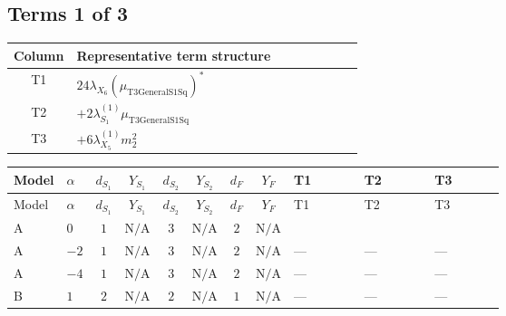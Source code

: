 \documentclass[8pt]{article}
\begin{document}
\begin{landscape}
\subsection*{Terms 1 of 3}
\begin{center}
\begin{tabular}{@{}c >{\raggedright\arraybackslash}p{0.82\linewidth}@{}}
\toprule
Column & Representative term structure \\
\midrule
T1 & \(\displaystyle 24 {\lambda_{X_{6}}} \left({\mu_{\mathrm{T3GeneralS1Sq}}}\right)^{*}\) \\
\midrule
T2 & \(\displaystyle +2 {\lambda_{S_1}^{(1)}} {\mu_{\mathrm{T3GeneralS1Sq}}}\) \\
\midrule
T3 & \(\displaystyle +6 {\lambda_{X_{5}}^{(1)}} {m_2^2}\) \\
\midrule
\bottomrule
\end{tabular}
\end{center}
\smallskip
\tiny
\begin{longtable}{@{}llcccccc >{\raggedright\arraybackslash}p{0.21\linewidth} >{\raggedright\arraybackslash}p{0.21\linewidth} >{\raggedright\arraybackslash}p{0.21\linewidth}@{}}
\toprule
Model & $\alpha$ & $d_{S_1}$ & $Y_{S_1}$ & $d_{S_2}$ & $Y_{S_2}$ & $d_F$ & $Y_F$ & T1 & T2 & T3 \\
\midrule
\endfirsthead
\toprule
Model & $\alpha$ & $d_{S_1}$ & $Y_{S_1}$ & $d_{S_2}$ & $Y_{S_2}$ & $d_F$ & $Y_F$ & T1 & T2 & T3 \\
\midrule
\endhead
A & $0$ & $1$ & $\text{N/A}$ & $3$ & $\text{N/A}$ & $2$ & $\text{N/A}$ & \scriptsize\adjustbox{max width=\linewidth}{$\begin{gathered} 24 {\lambda_{X_{6}}} \left({\mu_{\mathrm{T3GeneralS1Sq}}}\right)^{*}\end{gathered}$} & \scriptsize\adjustbox{max width=\linewidth}{$\begin{gathered} +2 {\lambda_{S_1}^{(1)}} {\mu_{\mathrm{T3GeneralS1Sq}}}\end{gathered}$} & \scriptsize\adjustbox{max width=\linewidth}{$\begin{gathered} +6 {\lambda_{X_{5}}^{(1)}} {m_2^2}\end{gathered}$} \\
\midrule
A & $-2$ & $1$ & $\text{N/A}$ & $3$ & $\text{N/A}$ & $2$ & $\text{N/A}$ & --- & --- & --- \\
\midrule
A & $-4$ & $1$ & $\text{N/A}$ & $3$ & $\text{N/A}$ & $2$ & $\text{N/A}$ & --- & --- & --- \\
\midrule
B & $1$ & $2$ & $\text{N/A}$ & $2$ & $\text{N/A}$ & $1$ & $\text{N/A}$ & --- & --- & --- \\

\end{longtable}
\end{landscape}
\end{document}
